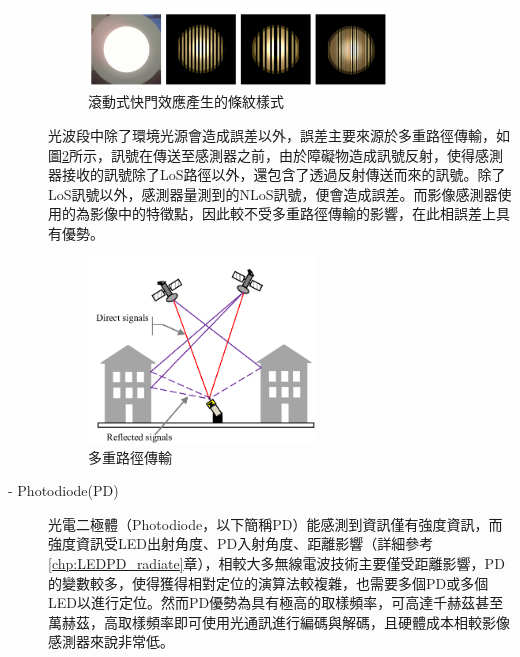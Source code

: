 \begin{description}
                    \begin{figure}[htpb]
                        \centering
                        \includegraphics[width=8cm]{ch2pic/rolling_shutter_case.png}
                        \caption{滾動式快門效應產生的條紋樣式\cite{pic:rolling_shutter_case}}
                        \label{pic:rolling_shutter_case}
                    \end{figure}

                    \qquad
                    光波段中除了環境光源會造成誤差以外，誤差主要來源於多重路徑傳輸，如圖\ref{pic:multipath}所示，訊號在傳送至感測器之前，由於障礙物造成訊號反射，使得感測器接收的訊號除了LoS路徑以外，還包含了透過反射傳送而來的訊號。除了LoS訊號以外，感測器量測到的NLoS訊號，便會造成誤差。而影像感測器使用的為影像中的特徵點，因此較不受多重路徑傳輸的影響，在此相誤差上具有優勢。

                    \begin{figure}[htpb]
                        \centering
                        \includegraphics[width=6cm]{ch2pic/multipath.png}
                        \caption{多重路徑傳輸\cite{pic:multipath}}
                        \label{pic:multipath}
                    \end{figure}

                    \item[- Photodiode(PD)]\hfill
                    
                    \qquad
                    光電二極體（Photodiode，以下簡稱PD）能感測到資訊僅有強度資訊，而強度資訊受LED出射角度、PD入射角度、距離影響（詳細參考\ref{chp:LEDPD_radiate}章），相較大多無線電波技術主要僅受距離影響，PD的變數較多，使得獲得相對定位的演算法較複雜，也需要多個PD或多個LED以進行定位。然而PD優勢為具有極高的取樣頻率，可高達千赫茲甚至萬赫茲，高取樣頻率即可使用光通訊進行編碼與解碼，且硬體成本相較影像感測器來說非常低。


\end{description}

